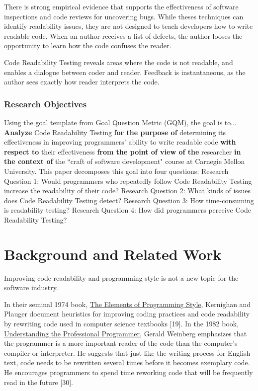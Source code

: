 \documentclass[conference]{IEEEtran}
\begin{document}
There is strong empirical evidence that supports the effectiveness of software inspections and code reviews for uncovering bugs. While theses techniques can identify readability issues, they are not designed to teach developers how to write readable code. When an author receives a list of defects, the author looses the opportunity to learn how the code confuses the reader.

Code Readability Testing reveals areas where the code is not readable, and enables a dialogue between coder and reader. Feedback is instantaneous, as the author sees exactly how reader interprets the code.

\subsubsection{Research Objectives}
Using the goal template from Goal Question Metric (GQM), the goal is to...
\textbf{Analyze} Code Readability Testing \textbf{for the purpose of} determining its effectiveness in improving programmers’ ability to write readable code \textbf{with respect to} their effectiveness \textbf{from the point of view of the} researcher \textbf{in the context of} the ``craft of software development" course at Carnegie Mellon University.
This paper decomposes this goal into four questions:
Research Question 1: Would programmers who repeatedly follow Code Readability Testing increase the readability of their code?
Research Question 2: What kinds of issues does Code Readability Testing detect?
Research Question 3: How time-consuming is readability testing?
Research Question 4: How did programmers perceive Code Readability Testing?


\section{Background and Related Work}
Improving code readability and programming style is not a new topic for the software industry.

In their seminal 1974 book, \underline{The Elements of Programming Style}, Kernighan and Plauger document heuristics for improving coding practices and code readability by rewriting code used in computer science textbooks [19]. In the 1982 book, \underline{Understanding the Professional Programmer}, Gerald Weinberg emphasizes that the programmer is a more important reader of the code than the computer’s compiler or interpreter. He suggests that just like the writing process for English text, code needs to be rewritten several times before it becomes exemplary code. He encourages programmers to spend time reworking code that will be frequently read in the future [30].
\end{document}
